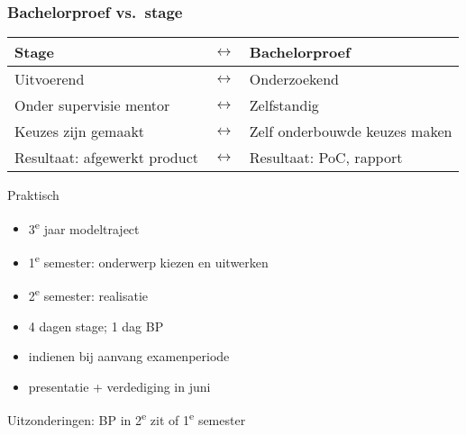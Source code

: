 \documentclass[aspectratio=169]{beamer}
\begin{document}
\begin{frame}
  \frametitle{Bachelorproef vs.\ stage}

  \centering
  \begin{tabular}{lcl}
    \toprule
    \textbf{Stage}               & $\leftrightarrow$ & \textbf{Bachelorproef}        \\
    \midrule
    Uitvoerend                   & $\leftrightarrow$ & Onderzoekend                  \\
    Onder supervisie mentor      & $\leftrightarrow$ & Zelfstandig                   \\
    Keuzes zijn gemaakt          & $\leftrightarrow$ & Zelf onderbouwde keuzes maken \\
    Resultaat: afgewerkt product & $\leftrightarrow$ & Resultaat: PoC, rapport       \\
    \bottomrule
  \end{tabular}
\end{frame}

\begin{frame}{Praktisch}

  \begin{itemize}
    \item 3\textsuperscript*{e} jaar modeltraject
    \item 1\textsuperscript*{e} semester: onderwerp kiezen en uitwerken
    \item 2\textsuperscript*{e} semester: realisatie
    \item 4 dagen stage; 1 dag BP
    \item indienen bij aanvang examenperiode
    \item presentatie + verdediging in juni
  \end{itemize}

  \bigskip

  Uitzonderingen: BP in 2\textsuperscript*{e} zit of 1\textsuperscript*{e} semester
\end{frame}
\end{document}
